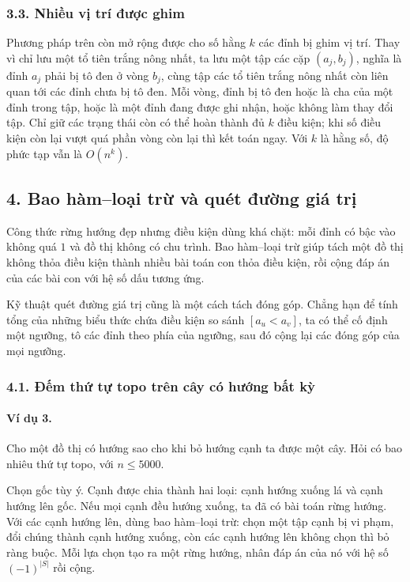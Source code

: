 \documentclass[11pt]{article}
\begin{document}
\subsubsection*{3.3. Nhiều vị trí được ghim}

Phương pháp trên còn mở rộng được cho số hằng \(k\) các đỉnh bị ghim vị trí.
Thay vì chỉ lưu một tổ tiên trắng nông nhất, ta lưu một tập các cặp
\((a_j,b_j)\), nghĩa là đỉnh \(a_j\) phải bị tô đen ở vòng \(b_j\), cùng tập các
tổ tiên trắng nông nhất còn liên quan tới các đỉnh chưa bị tô đen. Mỗi vòng,
đỉnh bị tô đen hoặc là cha của một đỉnh trong tập, hoặc là một đỉnh đang được
ghi nhận, hoặc không làm thay đổi tập. Chỉ giữ các trạng thái còn có thể hoàn
thành đủ \(k\) điều kiện; khi số điều kiện còn lại vượt quá phần vòng còn lại
thì kết toán ngay. Với \(k\) là hằng số, độ phức tạp vẫn là \(O(n^k)\).

\subsection*{4. Bao hàm--loại trừ và quét đường giá trị}

Công thức rừng hướng đẹp nhưng điều kiện dùng khá chặt: mỗi đỉnh có bậc vào
không quá \(1\) và đồ thị không có chu trình. Bao hàm--loại trừ giúp tách một
đồ thị không thỏa điều kiện thành nhiều bài toán con thỏa điều kiện, rồi cộng
đáp án của các bài con với hệ số dấu tương ứng.

Kỹ thuật quét đường giá trị cũng là một cách tách đóng góp. Chẳng hạn để tính
tổng của những biểu thức chứa điều kiện so sánh \([a_u<a_v]\), ta có thể cố
định một ngưỡng, tô các đỉnh theo phía của ngưỡng, sau đó cộng lại các đóng góp
của mọi ngưỡng.

\subsubsection*{4.1. Đếm thứ tự topo trên cây có hướng bất kỳ}

\paragraph{Ví dụ 3.}
Cho một đồ thị có hướng sao cho khi bỏ hướng cạnh ta được một cây. Hỏi có bao
nhiêu thứ tự topo, với \(n\le 5000\).

Chọn gốc tùy ý. Cạnh được chia thành hai loại: cạnh hướng xuống lá và cạnh
hướng lên gốc. Nếu mọi cạnh đều hướng xuống, ta đã có bài toán rừng hướng. Với
các cạnh hướng lên, dùng bao hàm--loại trừ: chọn một tập cạnh bị vi phạm, đổi
chúng thành cạnh hướng xuống, còn các cạnh hướng lên không chọn thì bỏ ràng
buộc. Mỗi lựa chọn tạo ra một rừng hướng, nhân đáp án của nó với hệ số
\((-1)^{|S|}\) rồi cộng.
\end{document}
